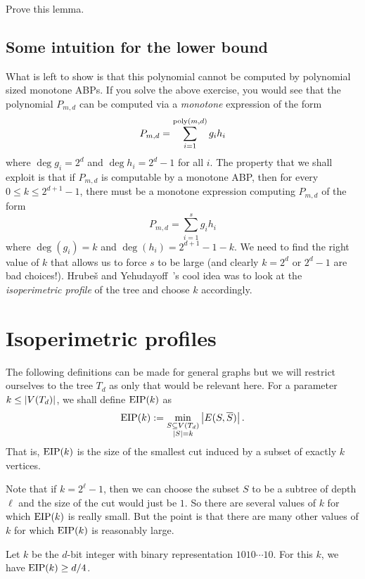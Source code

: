 \begin{exercise}
  Prove this lemma. 
\end{exercise}

\subsection{Some intuition for the lower bound}

What is left to show is that this polynomial cannot be computed by polynomial sized monotone ABPs. If you solve the above exercise, you would see that the polynomial $P_{m,d}$ can be computed via a \emph{monotone} expression of the form
\[
  P_{m,d} = \sum_{i=1}^{\operatorname{poly}(m,d)} g_i h_i
\]
where $\deg g_i = 2^d$ and $\deg h_i = 2^{d}-1$ for all $i$. The property that we shall exploit is that if $P_{m,d}$ is computable by a monotone ABP, then for every $0\leq k \leq 2^{d+1} - 1$, there must be a monotone expression computing $P_{m,d}$ of the form
\[
P_{m,d} = \sum_{i=1}^{s} g_i h_i
\]
where $\deg(g_i) = k$ and $\deg(h_i) = 2^{d+1} - 1 - k$. We need to find the right value of $k$ that allows us to force $s$ to be large (and clearly $k = 2^d$ or $2^{d} -1$ are bad choices!). Hrube\v{s} and Yehudayoff~\cite{HY16}'s cool idea was to look at the \emph{isoperimetric profile} of the tree and choose $k$ accordingly.

\section{Isoperimetric profiles}

The following definitions can be made for general graphs but we will restrict ourselves to the tree $T_d$ as only that would be relevant here. For a parameter $k \leq \left|V(T_d)\right|$, we shall define $\operatorname{EIP}(k)$ as
\[
  \operatorname{EIP}(k) := \min_{\substack{S\subseteq V(T_d)\\|S| = k}} \left|E(S,\overline{S})\right|.
\]
That is, $\operatorname{EIP}(k)$ is the size of the smallest cut induced by a subset of exactly $k$ vertices.

Note that if $k = 2^\ell - 1$, then we can choose the subset $S$ to be a subtree of depth $\ell$ and the size of the cut would just be $1$.
So there are several values of $k$ for which $\operatorname{EIP}(k)$ is really small.
But the point is that there are many other values of $k$ for which $\operatorname{EIP}(k)$ is reasonably large. 

\begin{lemma}\label{lem:eip-for-good-k}
  Let $k$ be the $d$-bit integer with binary representation $1010\cdots 10$. For this $k$, we have $\operatorname{EIP}(k) \geq d/4$. 
\end{lemma}

